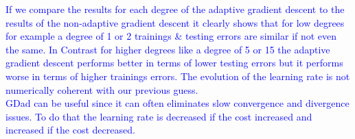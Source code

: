 \documentclass[a4paper]{article}
\begin{document}
\begin{enumerate}
\begin{table}[!h]
\end{table}
\textcolor{blue}{If we compare the results for each degree of the adaptive gradient descent to the results of the non-adaptive
gradient descent it clearly shows that for low degrees for example a degree of 1 or 2 trainings \& testing errors are similar if not even the same. In Contrast for higher degrees like a degree of 5 or 15 the adaptive gradient descent performs better in terms of lower testing errors but it performs worse in terms of higher trainings errors. The evolution of the learning rate is not numerically coherent with our previous guess. \\
 GDad can be useful since it can often eliminates slow convergence and divergence issues. To do that the learning rate is decreased if the cost increased and increased if the cost decreased. }


\end{enumerate}
\end{document}
